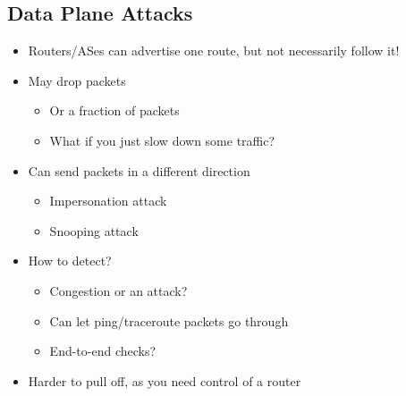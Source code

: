\subsection{Data Plane Attacks}
\begin{itemize}[nosep]
    \item Routers/ASes can advertise one route, but not necessarily follow it!
    \item May drop packets
          \begin{itemize}[nosep]
              \item Or a fraction of packets
              \item What if you just slow down some traffic?
          \end{itemize}
    \item Can send packets in a different direction
          \begin{itemize}[nosep]
              \item Impersonation attack
              \item Snooping attack
          \end{itemize}
    \item How to detect?
          \begin{itemize}[nosep]
              \item Congestion or an attack?
              \item Can let ping/traceroute packets go through
              \item End-to-end checks?
          \end{itemize}
    \item Harder to pull off, as you need control of a router
\end{itemize}

